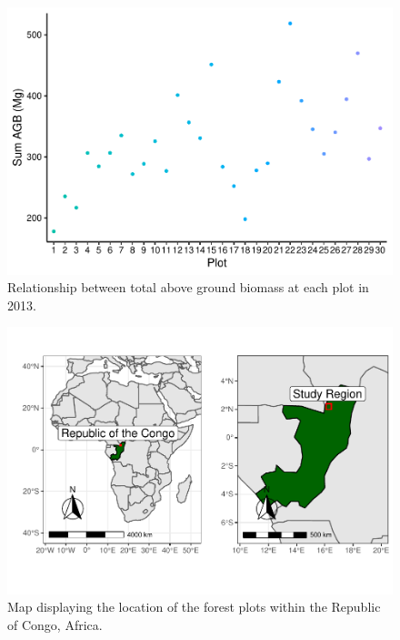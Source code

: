 \documentclass[12pt,]{article}
\begin{document}
\begin{figure}
\centering
\includegraphics{Project_Template_files/figure-latex/dataviz_sum_2013-1.pdf}
\caption{Relationship between total above ground biomass at each plot in
2013.}
\end{figure}

\newpage

\begin{figure}
\centering
\includegraphics{Project_Template_files/figure-latex/mapping1-1.pdf}
\caption{Map displaying the location of the forest plots within the
Republic of Congo, Africa.}
\end{figure}
\end{document}
